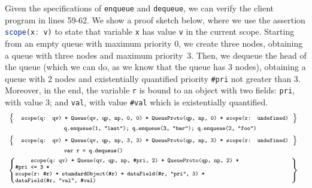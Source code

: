 \documentclass{llncs}
\def\jsinline{\lstinline[language=JavaScript, basicstyle=\small]}
\begin{document}
Given the specifications of \jsinline|enqueue| and \jsinline|dequeue|, we can 
verify the client program in lines 59-62. We show a proof 
sketch below, where we use the assertion \jsinline|scope(x: v)| to state that 
variable \jsinline|x| has value \jsinline|v| in the current scope.
Starting from an empty queue with maximum priority 
$0$, we create three nodes, obtaining a queue with three nodes and 
maximum priority~$3$. Then, we dequeue the head of the queue 
(which we can do, as we know that the queue has 3 nodes), obtaining a queue with 2 nodes and existentially
quantified priority \jsinline|#pri| not greater than $3$. Moreover, in the end, 
the variable \jsinline|r| is bound to an object with two fields:
\jsinline|pri|,  with value $3$;
and \jsinline|val|,  with value \jsinline|#val| which is existentially quantified. 
% 
\begin{displaymath} 
{\scriptsize
\hspace*{-0.2cm}
\begin{array}{c}
\left\{ {\begin{array}{c}
\text{\texttt{ scope(q: qv) * Queue(qv, qp, np, 0, 0) * QueueProto(qp, np, 0) * scope(r: undefined)}} 
\end{array}} \right\} \\[1.5mm]
\begin{minipage}{0.62\textwidth}
\begin{verbatim}
 q.enqueue(1, "last"); q.enqueue(3, "bar"); q.enqueue(2, "foo") 
\end{verbatim}
\end{minipage} \\[1.5mm]
\left\{ {\begin{array}{c}
 \text{\texttt{ scope(q: qv) * Queue(qv, qp, np, 3, 3) * QueueProto(qp, np, 3) * scope(r: undefined)}} 
\end{array}} \right\} \\[1.5mm]
\begin{minipage}{0.62\textwidth}
\begin{verbatim}
 var r = q.dequeue()
\end{verbatim}
\end{minipage} \\[1.5mm]
\left\{ 
\begin{minipage}{0.95\textwidth}
\begin{verbatim}
     scope(q: qv) * Queue(qv, qp, np, #pri, 2) * QueueProto(qp, np, 2) * #pri <= 3 * 
 scope(r: #r) * standardObject(#r) * dataField(#r, "pri", 3) * dataField(#r, "val", #val)
\end{verbatim}
\end{minipage}\ \right\}
\end{array}}
\end{displaymath}
\end{document}
